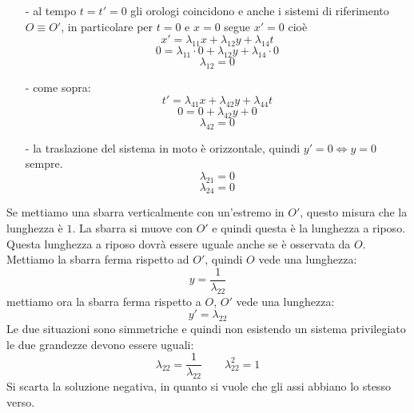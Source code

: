 \begin{itemize}
\item[-] al tempo $t=t'=0$ gli orologi coincidono e anche i sistemi di riferimento $O\equiv O'$, in particolare per $t=0$ e $x=0$ segue $x'=0$ cioè
\begin{equation*}x'=\lambda_{11}x+\lambda_{12}y+\lambda_{14}t\end{equation*}
\begin{equation*}0=\lambda_{11}\cdot 0+\lambda_{12}y+\lambda_{14}\cdot 0\end{equation*}
\begin{equation*}\lambda_{12}=0\end{equation*}
\item[-] come sopra:
\begin{equation*}t'=\lambda_{41}x+\lambda_{42}y+\lambda_{44}t\end{equation*}
\begin{equation*}0=0+\lambda_{42}y+0\end{equation*}
\begin{equation*}\lambda_{42}=0\end{equation*}
\item[-] la traslazione del sistema in moto è orizzontale, quindi $y'=0\Leftrightarrow y=0$ sempre.
\begin{equation*}\lambda_{21}=0\end{equation*}
\begin{equation*}\lambda_{24}=0\end{equation*}

\end{itemize}

Se mettiamo una sbarra verticalmente con un'estremo in $O'$, questo misura che la lunghezza è $1$. La sbarra si muove con $O'$ e quindi questa è la lunghezza a riposo. Questa lunghezza a riposo dovrà essere uguale anche se è osservata da $O$. Mettiamo la sbarra ferma rispetto ad $O'$, quindi $O$ vede una lunghezza:
\begin{equation*}y=\frac{1}{\lambda_{22}}\end{equation*}
mettiamo ora la sbarra ferma rispetto a $O$, $O'$ vede una lunghezza:
\begin{equation*}y'=\lambda_{22}\end{equation*}
Le due situazioni sono simmetriche e quindi non esistendo un sistema privilegiato le due grandezze devono essere uguali:
\begin{equation*}\lambda_{22}=\frac{1}{\lambda_{22}}\qquad\lambda^2_{22}=1\end{equation*}
Si scarta la soluzione negativa, in quanto si vuole che gli assi abbiano lo stesso verso.


